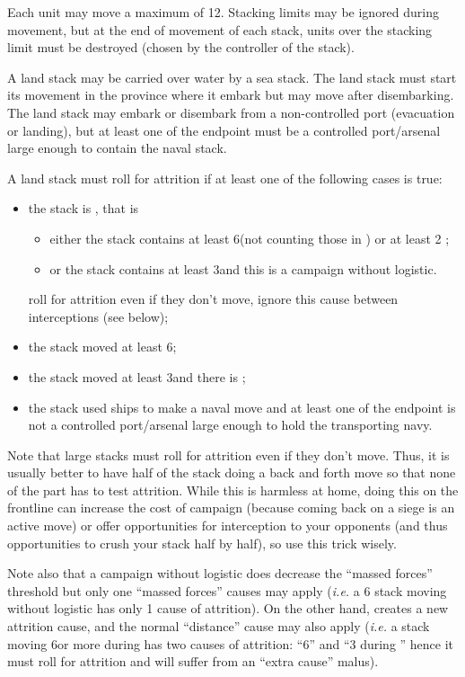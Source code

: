 
Each unit may move a maximum of 12\MP. Stacking limits may be ignored during
movement, but at the end of movement of each stack, units over the stacking
limit must be destroyed (chosen by the controller of the stack).

A land stack may be carried over water by a sea stack. The land stack must
start its movement in the province where it embark but may move after
disembarking. The land stack may embark or disembark from a non-controlled
port (evacuation or landing), but at least one of the endpoint must be a
controlled port/arsenal large enough to contain the naval stack.

A land stack must roll for attrition if at least one of the following cases is
true:
\begin{itemize}
\item the stack is , that is
  \begin{itemize}
  \item either the stack contains at least 6\LD (not counting those in \Pasha)
    or at least 2 \Pashas;
  \item or the stack contains at least 3\LD and this is a campaign without
    logistic.
  \end{itemize}
   roll for attrition even if they don't move, ignore
  this cause between interceptions (see below);
\item the stack moved at least 6\MP;
\item the stack moved at least 3\MP and there is ;
\item the stack used ships to make a naval move and at least one of the
  endpoint is not a controlled port/arsenal large enough to hold the
  transporting navy.
\end{itemize}

Note that large stacks must roll for attrition even if they don't move. Thus,
it is usually better to have half of the stack doing a back and forth move so
that none of the part has to test attrition. While this is harmless at home,
doing this on the frontline can increase the cost of campaign (because coming
back on a siege is an active move) or offer opportunities for interception
to your opponents (and thus opportunities to crush your stack half by half),
so use this trick wisely.

Note also that a campaign without logistic does decrease the ``massed forces''
threshold but only one ``massed forces'' causes may apply (\emph{i.e.} a 6\LD
stack moving without logistic has only 1 cause of attrition). On the other
hand,  creates a new attrition cause, and the normal
``distance'' cause may also apply (\emph{i.e.} a stack moving 6\MP or more
during  has two causes of attrition: ``6\MP'' and ``3\MP
during '' hence it must roll for attrition and will suffer
from an ``extra cause'' malus).

